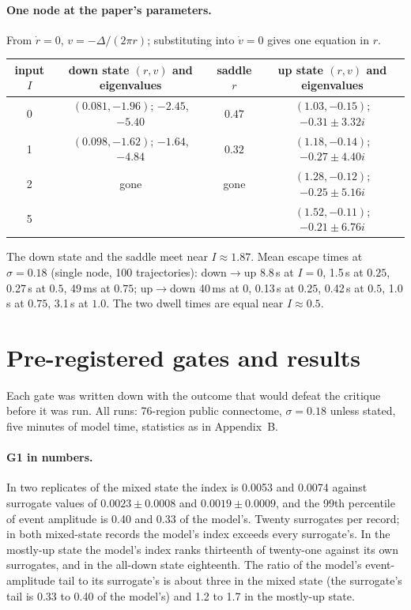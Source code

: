 \documentclass[11pt]{article}
\theoremstyle{definition}\newtheorem{observation}{Observation}
\theoremstyle{remark}\newtheorem{remark}{Remark}
\begin{document}
\paragraph{One node at the paper's parameters.} From $\dot r=0$, $v=-\Delta/(2\pi r)$; substituting into $\dot v=0$ gives one equation in $r$.
\begin{center}\small
\begin{tabular}{cccc}
\toprule
input $I$ & down state $(r,v)$ and eigenvalues & saddle $r$ & up state $(r,v)$ and eigenvalues \\
\midrule
0 & $(0.081,-1.96)$; $-2.45$, $-5.40$ & $0.47$ & $(1.03,-0.15)$; $-0.31\pm3.32i$ \\
1 & $(0.098,-1.62)$; $-1.64$, $-4.84$ & $0.32$ & $(1.18,-0.14)$; $-0.27\pm4.40i$ \\
2 & gone & gone & $(1.28,-0.12)$; $-0.25\pm5.16i$ \\
5 & & & $(1.52,-0.11)$; $-0.21\pm6.76i$ \\
\bottomrule
\end{tabular}
\end{center}
The down state and the saddle meet near $I\approx1.87$. Mean escape times at $\sigma=0.18$ (single node, 100 trajectories): down$\to$up 8.8\,s at $I=0$, 1.5\,s at $0.25$, 0.27\,s at $0.5$, 49\,ms at $0.75$; up$\to$down 40\,ms at $0$, 0.13\,s at $0.25$, 0.42\,s at $0.5$, 1.0\,s at $0.75$, 3.1\,s at $1.0$. The two dwell times are equal near $I\approx0.5$.

\section{Pre-registered gates and results}
Each gate was written down with the outcome that would defeat the critique before it was run. All runs: 76-region public connectome, $\sigma=0.18$ unless stated, five minutes of model time, statistics as in Appendix~B.

\paragraph{G1 in numbers.} In two replicates of the mixed state the index is 0.0053 and 0.0074 against surrogate values of $0.0023\pm0.0008$ and $0.0019\pm0.0009$, and the 99th percentile of event amplitude is 0.40 and 0.33 of the model's. Twenty surrogates per record; in both mixed-state records the model's index exceeds every surrogate's. In the mostly-up state the model's index ranks thirteenth of twenty-one against its own surrogates, and in the all-down state eighteenth. The ratio of the model's event-amplitude tail to its surrogate's is about three in the mixed state (the surrogate's tail is 0.33 to 0.40 of the model's) and 1.2 to 1.7 in the mostly-up state.
\end{document}
